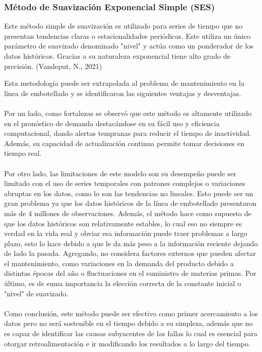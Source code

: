 \documentclass[10pt]{article}
\begin{document}
\subsubsection{Método de Suavización Exponencial Simple (SES)}
Este método simple de suavización es utilizado para series de tiempo que no presentan tendencias claras o estacionalidades periódicas. Este utiliza un único parámetro de suavizado denominado "nivel" y actúa como un ponderador de los datos históricos. Gracias a su naturaleza exponencial tiene alto grado de precisión. (Vandeput, N., 2021)

Esta metodología puede ser extrapolada al problema de mantenimiento en la línea de embotellado y se identificaron las siguientes ventajas y desventajas. \\
\\
Por un lado, como fortalezas se observó que este método es altamente utilizado en el pronóstico de demanda destacándose en su fácil uso y eficiencia computacional, dando alertas tempranas para reducir el tiempo de inactividad. Además, su capacidad de actualización continua permite tomar decisiones en tiempo real. \\ 
\\
Por otro lado, las limitaciones de este modelo son su desempeño puede ser limitado con el uso de series temporales con patrones complejos o variaciones abruptas en los datos, como lo son las tendencias no lineales. Esto puede ser un gran problema ya que los datos históricos de la línea de embotellado presentaron más de 4 millones de observaciones. Además, el método hace como supuesto de que los datos históricos son relativamente estables, lo cual eso no siempre es verdad en la vida real y obviar esa información puede traer problemas a largo plazo, esto lo hace debido a que le da más peso a la información reciente dejando de lado la pasada. Agregando, no considera factores externos que pueden afectar el mantenimiento, como variaciones en la demanda del producto debido a distintas épocas del año o fluctuaciones en el suministro de materias primas. Por último, es de suma importancia la elección correcta de la constante inicial o "nivel" de suavizado. \\
\\
Como conclusión, este método puede ser efectivo como primer acercamiento a los datos pero no será sostenible en el tiempo debido a su simpleza, además que no es capaz de identificar las causas subyacentes de las fallas lo cual es esencial para otorgar retroalimentación e ir modificando los resultados a lo largo del tiempo. 
\end{document}
